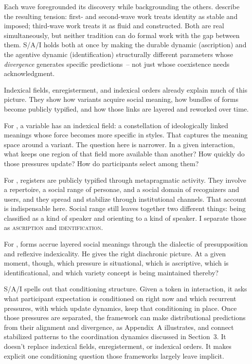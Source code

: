 \documentclass[11pt,letterpaper]{article}
\begin{document}
Each wave foregrounded its discovery while backgrounding the others. \textcite{drummond_schleef2016_identity} describe the resulting tension: first- and second-wave work treats identity as stable and imposed; third-wave work treats it as fluid and constructed. Both are real simultaneously, but neither tradition can do formal work with the gap between them. S/A/I holds both at once by making the durable dynamic (ascription) and the agentive dynamic (identification) structurally different parameters whose \emph{divergence} generates specific predictions~-- not just whose coexistence needs acknowledgment.

Indexical fields, enregisterment, and indexical orders already explain much of this picture. They show how variants acquire social meaning, how bundles of forms become publicly typified, and how those links are layered and reworked over time.

For \textcite{eckert2008indexical,Eckert2012}, a variable has an indexical field: a constellation of ideologically linked meanings whose force becomes more specific in styles. That captures the meaning space around a variant. The question here is narrower. In a given interaction, what keeps one region of that field more available than another? How quickly do those pressures update? How do participants select among them?

For \textcite{agha2005}, registers are publicly typified through metapragmatic activity. They involve a repertoire, a social range of personae, and a social domain of recognizers and users, and they spread and stabilize through institutional channels. That account is indispensable here. Social range still leaves together two different things: being classified as a kind of speaker and orienting to a kind of speaker. I separate those as \textsc{ascription} and \textsc{identification}.

For \textcite{silverstein2003}, forms accrue layered social meanings through the dialectic of presupposition and reflexive indexicality. He gives the right diachronic picture. At a given moment, though, which pressure is situational, which is ascriptive, which is identificational, and which variety concept is being maintained thereby?

S/A/I spells out that conditioning structure. Given a token in interaction, it asks what participant expectation is conditioned on right now and which recurrent pressures, with which update dynamics, keep that conditioning in place. Once those pressures are separated, the framework can make distributional predictions from their alignment and divergence, as Appendix~A illustrates, and connect stabilized patterns to the coordination dynamics discussed in Section~3. It doesn't replace indexical fields, enregisterment, or indexical orders. It makes explicit one conditioning question those frameworks largely leave implicit.
\end{document}

